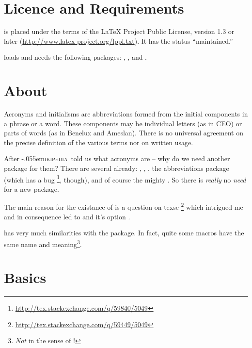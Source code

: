 \documentclass[DIV10,toc=index,toc=bib]{cnpkgdoc}
\newcommand*\wikipedia{\libertineGlyph{W.alt}\kern-.055em\textsc{ikipedia}}
\begin{document}
\newpage
\section{Licence and Requirements}
\acro is placed under the terms of the LaTeX Project Public License,
version 1.3 or later (\url{http://www.latex-project.org/lppl.txt}).
It has the status ``maintained.''

\acro loads and needs the following packages: ,
,  and .

\section{About}
\begin{zitat}
 Acronyms and initialisms are abbreviations formed from the initial components
 in a phrase or a word. These components may be individual letters (as in CEO)
 or parts of words (as in Benelux and Ameslan). There is no universal agreement
 on the precise definition of the various terms nor on written usage.
\end{zitat}
After \wikipedia\ told us what acronyms are -- why do we need another package
for them? There are several already:  \cite{acronym},
 \cite{acromake},  \cite{acroterm}, the
abbreviations package  \cite{abbrevs} (which has a bug%
\footnote{\url{http://tex.stackexchange.com/q/59840/5049}}, though), and of
course the mighty  \cite{glossaries}. So there is \emph{really}
no \emph{need} for a new package.

The main reason for the existance of \acro is a question on \acs{texse}%
\footnote{\url{http://tex.stackexchange.com/q/59449/5049}} which intrigued me
and in consequence led to \acro and it's option .

\acro has very much similarities with the  package. In fact, quite
some macros have the same name and meaning\footnote{\emph{Not} in the sense of
\code{\textbackslash\textcolor{code}{meaning}}!}.

\section{Basics}
\end{document}

